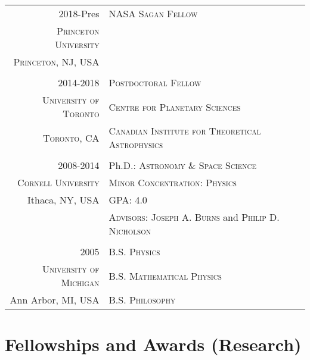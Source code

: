 \documentclass[10pt]{article} %
\begin{document}
\begin{tabular}{r|p{11cm}}
{2018-Pres} & \textsc{NASA Sagan Fellow} \\
\textsc{Princeton University} & \\
 \textsc{Princeton, NJ, USA} &  \\

\multicolumn{2}{c}{} \\

{2014-2018} & \textsc{Postdoctoral Fellow} \\
\textsc{University of Toronto} & \textsc{Centre for Planetary Sciences} \\
\textsc{Toronto, CA} & \textsc{Canadian Institute for Theoretical Astrophysics} \\

\multicolumn{2}{c}{} \\

\textsc{2008-2014} & Ph.D.: \textsc{Astronomy \& Space Science} \\
\textsc{Cornell University} & \textsc{Minor Concentration}:  \textsc{Physics} \\
Ithaca, NY, USA & GPA: 4.0 \\ 
& \textsc{Advisors}: \textsc{Joseph A. Burns} and \textsc{Philip D. Nicholson}\\

\multicolumn{2}{c}{} \\


\textsc{2005} & \textsc{B.S. Physics} \\
\textsc{University of Michigan} & \textsc{B.S. Mathematical Physics} \\
Ann Arbor, MI, USA & \textsc{B.S. Philosophy} \\
\end{tabular}


\section{Fellowships and Awards (Research)}
\end{document}
